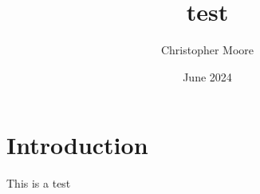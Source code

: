 \documentclass{article}
\title{test}
\author{Christopher Moore}
\date{June 2024}
\begin{document}
\maketitle

\section{Introduction}

This is a test
\end{document}

